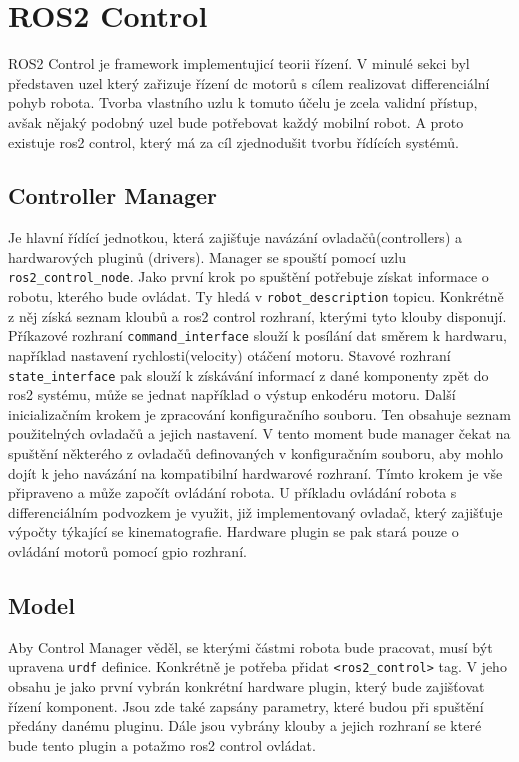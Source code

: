 \section{ROS2 Control}
ROS2 Control je framework implementujicí teorii řízení. V minulé sekci byl představen uzel který zařizuje řízení dc motorů s cílem realizovat differenciální pohyb robota. Tvorba vlastního uzlu k tomuto účelu je zcela validní přístup, avšak nějaký podobný uzel bude potřebovat každý mobilní robot. A proto existuje ros2 control, který má za cíl zjednodušit tvorbu řídících systémů.

\subsection{Controller Manager}
Je hlavní řídící jednotkou, která zajišťuje navázání ovladačů(controllers) a hardwarových pluginů (drivers). Manager se spouští pomocí uzlu \verb|ros2_control_node|. Jako první krok po spuštění potřebuje získat informace o robotu, kterého bude ovládat. Ty hledá v \verb|robot_description| topicu. Konkrétně z něj získá seznam kloubů a ros2 control rozhraní, kterými tyto klouby disponují. Příkazové rozhraní \verb|command_interface| slouží k posílání dat směrem k hardwaru, například nastavení rychlosti(velocity) otáčení motoru. Stavové rozhraní \verb|state_interface| pak slouží k získávání informací z dané komponenty zpět do ros2 systému, může se jednat například o výstup enkodéru motoru. Další inicializačním krokem je zpracování konfiguračního souboru. Ten obsahuje seznam použitelných ovladačů a jejich nastavení. V tento moment bude manager čekat na spuštění některého z ovladačů definovaných v konfiguračním souboru, aby mohlo dojít k jeho navázání na kompatibilní hardwarové rozhraní. Tímto krokem je vše připraveno a může započít ovládání robota.
U příkladu ovládání robota s differenciálním podvozkem je využit, již implementovaný ovladač, který zajišťuje výpočty týkající se kinematografie. Hardware plugin se pak stará pouze o ovládání motorů pomocí gpio rozhraní.

\subsection{Model}
Aby Control Manager věděl, se kterými částmi robota bude pracovat, musí být upravena \verb|urdf| definice. Konkrétně je potřeba přidat \verb|<ros2_control>| tag. V jeho obsahu je jako první vybrán konkrétní hardware plugin, který bude zajišťovat řízení komponent. Jsou zde také zapsány parametry, které budou při spuštění předány danému pluginu. Dále jsou vybrány klouby a jejich rozhraní se které bude tento plugin a potažmo ros2 control ovládat. 

